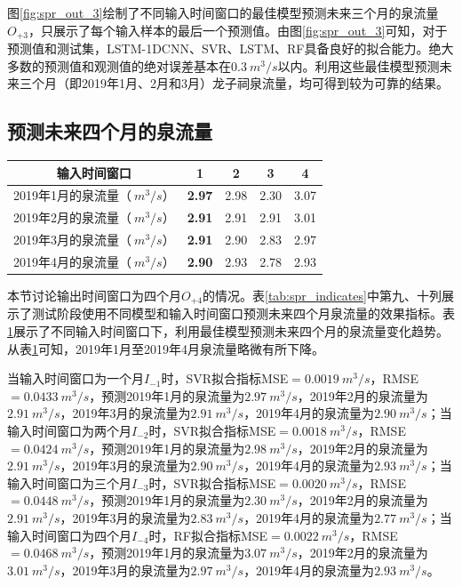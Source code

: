 图\ref{fig:spr_out_3}绘制了不同输入时间窗口的最佳模型预测未来三个月的泉流量$O_{+3}$，只展示了每个输入样本的最后一个预测值。由图\ref{fig:spr_out_3}可知，对于预测值和测试集，LSTM-1DCNN、SVR、LSTM、RF具备良好的拟合能力。绝大多数的预测值和观测值的绝对误差基本在$\SI{0.3}{m^{3}/s}$以内。利用这些最佳模型预测未来三个月（即2019年1月、2月和3月）龙子祠泉流量，均可得到较为可靠的结果。

\subsection{预测未来四个月的泉流量}\label{sec:spr_four}

\begin{table}[!htbp]
  \centering
  \label{tab:spr_four}
  \footnotesize
  \begin{tabular}{ccccc}
    \toprule
    输入时间窗口 & 1 & 2 & 3 & 4\\
    \midrule
    2019年1月的泉流量（$\SI{}{m^{3}/s}$）& \textbf{2.97} & 2.98 & 2.30 & 3.07 \\
    2019年2月的泉流量（$\SI{}{m^{3}/s}$）& \textbf{2.91} & 2.91 & 2.91 & 3.01 \\
    2019年3月的泉流量（$\SI{}{m^{3}/s}$）& \textbf{2.91} & 2.90 & 2.83 & 2.97 \\
    2019年4月的泉流量（$\SI{}{m^{3}/s}$）& \textbf{2.90} & 2.93 & 2.78 & 2.93 \\
    \bottomrule
  \end{tabular}
\end{table}

本节讨论输出时间窗口为四个月$O_{+4}$的情况。表\ref{tab:spr_indicates}中第九、十列展示了测试阶段使用不同模型和输入时间窗口预测未来四个月泉流量的效果指标。表\ref{tab:spr_four}展示了不同输入时间窗口下，利用最佳模型预测未来四个月的泉流量变化趋势。从表\ref{tab:spr_four}可知，2019年1月至2019年4月泉流量略微有所下降。

当输入时间窗口为一个月$I_{-1}$时，SVR拟合指标MSE$=\SI{0.0019}{m^{3}/s}$，RMSE$=\SI{0.0433}{m^{3}/s}$，预测2019年1月的泉流量为$\SI{2.97}{m^{3}/s}$，2019年2月的泉流量为$\SI{2.91}{m^{3}/s}$，2019年3月的泉流量为$\SI{2.91}{m^{3}/s}$，2019年4月的泉流量为$\SI{2.90}{m^{3}/s}$；当输入时间窗口为两个月$I_{-2}$时，SVR拟合指标MSE$=\SI{0.0018}{m^{3}/s}$，RMSE$=\SI{0.0424}{m^{3}/s}$，预测2019年1月的泉流量为$\SI{2.98}{m^{3}/s}$，2019年2月的泉流量为$\SI{2.91}{m^{3}/s}$，2019年3月的泉流量为$\SI{2.90}{m^{3}/s}$，2019年4月的泉流量为$\SI{2.93}{m^{3}/s}$；当输入时间窗口为三个月$I_{-3}$时，SVR拟合指标MSE$=\SI{0.0020}{m^{3}/s}$，RMSE$=\SI{0.0448}{m^{3}/s}$，预测2019年1月的泉流量为$\SI{2.30}{m^{3}/s}$，2019年2月的泉流量为$\SI{2.91}{m^{3}/s}$，2019年3月的泉流量为$\SI{2.83}{m^{3}/s}$，2019年4月的泉流量为$\SI{2.77}{m^{3}/s}$；当输入时间窗口为四个月$I_{-4}$时，RF拟合指标MSE$=\SI{0.0022}{m^{3}/s}$，RMSE$=\SI{0.0468}{m^{3}/s}$，预测2019年1月的泉流量为$\SI{3.07}{m^{3}/s}$，2019年2月的泉流量为$\SI{3.01}{m^{3}/s}$，2019年3月的泉流量为$\SI{2.97}{m^{3}/s}$，2019年4月的泉流量为$\SI{2.93}{m^{3}/s}$。

